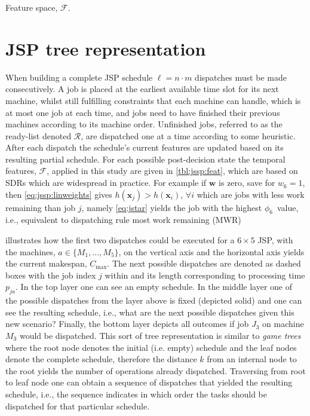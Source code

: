 \documentclass[smallextended]{llncs}
\renewcommand{\vec}[1]{\mathbf{#1}}
\newcommand{\phiwrmJob}{$\phi_6$}
\begin{document}
\begin{table}[t]  \centering
  \caption{Feature space, $\mathcal{F}$.}
  \label{tbl:jssp:feat}
  
\end{table}

\section{JSP tree representation}\label{sec:gametree}
When building a complete JSP schedule $\ell=n\cdot m$ dispatches must be made consecutively. 
A job is placed at the earliest available time slot for its next machine, whilst still fulfilling constraints that each machine can handle, which is at most one job at each time, and jobs need to have finished their previous machines according to its machine order. 
Unfinished jobs, referred to as the ready-list denoted $\mathcal{R}$, are dispatched one at a time according to some heuristic. After each dispatch the schedule's current features are updated based on its resulting partial schedule. 
For each possible post-decision state the temporal features, $\mathcal{F}$, applied in this study are given in \cref{tbl:jssp:feat}, which are based on SDRs which are widespread in practice. For example if $\vec{w}$ is zero, save for $w_6=1$, then \cref{eq:jssp:linweights} gives $h(\vec{x}_j)>h(\vec{x}_i)$, 
$\forall i$ which are jobs with less work remaining than job $j$, namely \cref{eq:jstar} yields the job with the highest \phiwrmJob\ value, 
i.e., equivalent to dispatching rule most work remaining (MWR) 


 illustrates how the first two dispatches could be executed for a $6\times 5$ JSP, with the machines, $a\in\{M_1,...,M_5\}$, on the vertical axis and the horizontal axis yields the current makespan, $C_{\max}$. The next possible dispatches are denoted as dashed boxes with the job index $j$ within and its length corresponding to processing time $p_{ja}$.
In the top layer one can see an empty schedule.
In the middle layer one of the possible dispatches from the layer above is fixed (depicted solid) and one can see the resulting 
schedule, i.e., what are the next possible dispatches given this new scenario? Finally, the bottom layer depicts all outcomes if job $J_3$ on machine $M_3$ would be dispatched. 
This sort of tree representation is similar 
to \emph{game trees} \cite{vonNeumann44} where the root node denotes the initial (i.e. empty) schedule and the leaf nodes 
denote the complete schedule, therefore the distance $k$ from an internal node to the root yields the number of 
operations already dispatched. Traversing from root to leaf node one can obtain a sequence of dispatches that yielded 
the resulting schedule, i.e., the sequence indicates in which order the tasks should be dispatched for that particular 
schedule. 
\end{document}
